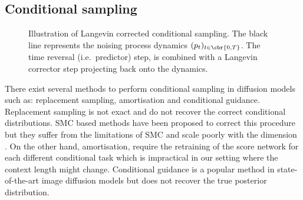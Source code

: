 \subsection{Conditional sampling}
\label{sec:conditional_sampling}

\begin{figure}
	\centering
	\begin{center}
	\end{center}
	\caption{
		Illustration of Langevin corrected conditional sampling.
		The black line represents the noising process dynamics \((p_t)_{t \in \cbr{0,T}}\).
		The \textcolor{tabblue}{time reversal (i.e.\ predictor)} step, is combined with a \textcolor{tabred}{Langevin corrector} step projecting back onto the dynamics.
	}
	\label{fig:predictor_corrector}
\end{figure}
There exist several methods to perform conditional sampling in diffusion models such as: replacement sampling, amortisation and conditional guidance.
Replacement sampling is not exact and do not recover the correct conditional distributions.
SMC based methods have been proposed to correct this procedure but they suffer from the limitations of SMC and scale poorly with the dimension \parencite{trippe2022Diffusion}.
On the other hand, amortisation, require the retraining of the score network for each different conditional task which is impractical in our setting where the context length might change.
Conditional guidance is a popular method in state-of-the-art image diffusion models but does not recover the true posterior distribution.

